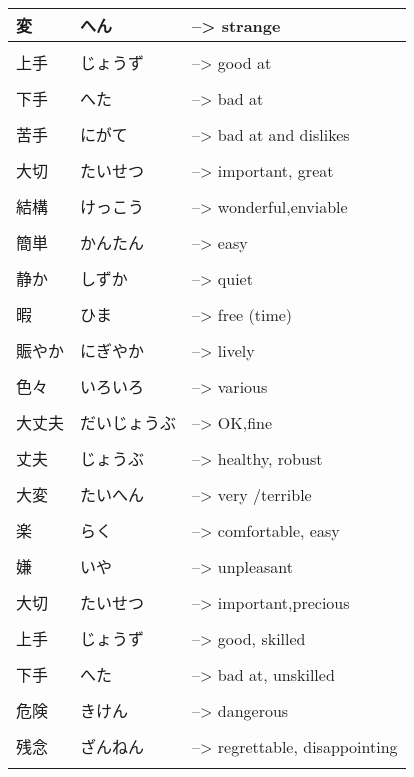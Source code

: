 \documentclass{article}
\begin{document}
\begin{tabular}{ l | l l }
変&へん&--> strange \\ \hline\\[-1em]
上手&じょうず&--> good at \\ \hline\\[-1em]
下手&へた&--> bad at \\ \hline\\[-1em]
苦手&にがて&--> bad at and dislikes \\ \hline\\[-1em]
大切 &たいせつ&--> important, great\\ \hline\\[-1em]
結構 &けっこう&--> wonderful,enviable\\ \hline\\[-1em]
簡単 &かんたん&--> easy\\ \hline\\[-1em]
静か&しずか&--> quiet\\ \hline\\[-1em]
暇&ひま&--> free (time)\\ \hline\\[-1em]
賑やか&にぎやか&--> lively\\ \hline\\[-1em]
色々&いろいろ&--> various\\ \hline\\[-1em]
大丈夫&だいじょうぶ&--> OK,fine\\ \hline\\[-1em]
丈夫&じょうぶ&--> healthy, robust\\ \hline\\[-1em]
大変&たいへん&--> very /terrible\\ \hline\\[-1em]
楽 &らく&--> comfortable, easy\\ \hline\\[-1em]
嫌 &いや&--> unpleasant\\ \hline\\[-1em]
大切 &たいせつ&--> important,precious\\ \hline\\[-1em]
上手&じょうず&--> good, skilled\\ \hline\\[-1em]
下手&へた&--> bad at, unskilled\\ \hline\\[-1em]
危険&きけん&--> dangerous\\ \hline\\[-1em]
残念&ざんねん&--> regrettable, disappointing\\ \hline\\[-1em]

\end{tabular}
\end{document}
